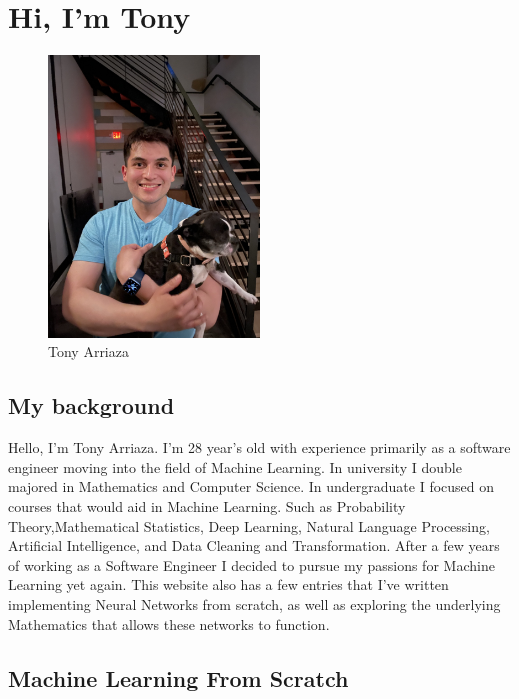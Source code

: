 \documentclass{article}
\begin{document}
\section*{Hi, I'm Tony}
\begin{figure}[h]
    \centering
    \includegraphics[width=0.5\textwidth]{static/images/myself.png}
    \caption{Tony Arriaza}
\end{figure}

\subsection*{ My background}

Hello, I'm Tony Arriaza. I'm 28 year's old with experience primarily as a software engineer moving into the field of Machine Learning. In university I double majored in Mathematics and Computer Science. In undergraduate I focused on courses that would aid in Machine Learning. Such as Probability Theory,Mathematical Statistics, Deep Learning, Natural Language Processing, Artificial Intelligence, and Data Cleaning and Transformation. After a few years of working as a Software Engineer I decided to pursue my passions for Machine Learning yet again. This website also has a few entries that I've written implementing Neural Networks from scratch, as well as exploring the underlying Mathematics that allows these networks to function. 

\subsection*{Machine Learning From Scratch}
\end{document}
